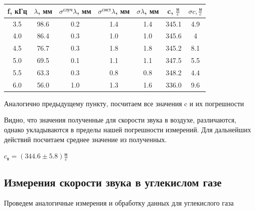 \documentclass[12pt,a4paper]{article}
\begin{document}
\begin{center}
\begin{tabular}{|c|c|c|c|c|c|c|}
 \hline 
 f, кГц & $\lambda$, мм & $\sigma^{\text{случ}}{\lambda}$, мм & $\sigma^{\text{сист}}{\lambda}$, мм & $\sigma{\lambda}$, мм & c, $\frac{\text{м}}{c}$ & $\sigma{c}, \frac{\text{м}}{c}$ \\ 
 \hline 
 3.5 & 98.6 & 0.2 & 1.4 & 1.4 & 345.1 & 4.9 \\ 
 \hline 
 4.0 & 86.4 & 0.3 & 1.0 & 1.0 & 345.6 & 4 \\ 
 \hline 
 4.5 & 76.7 & 0.3 & 1.8 & 1.8 & 345.2 & 8.1 \\ 
 \hline 
 5.0 & 69.5 & 0.1 & 1.1 & 1.1 & 347.5 & 5.5 \\ 
 \hline 
 5.5 & 63.3 & 0.3 & 0.8 & 0.8 & 348.2 & 4.4 \\ 
 \hline 
 6.0 & 56.0 & 1.0 & 1.3 & 1.6 & 336.0 & 9.6 \\ 
 \hline 
 \end{tabular}  
\end{center}

Аналогично предыдущему пункту, посчитаем все значения c и их погрешности

Видно, что значения полученные для скорости звука в воздухе, различаются, однако укладываются в пределы нашей погрешности измерений. Для дальнейших действий посчитаем среднее значение из полученных.

$c_{\text{в}} = (344.6 \pm 5.8)\frac{\text{м}}{c}$ 

\subsection*{Измерения скорости звука в углекислом газе}

Проведем аналогичные измерения и обработку данных для углекислого газа
\end{document}
